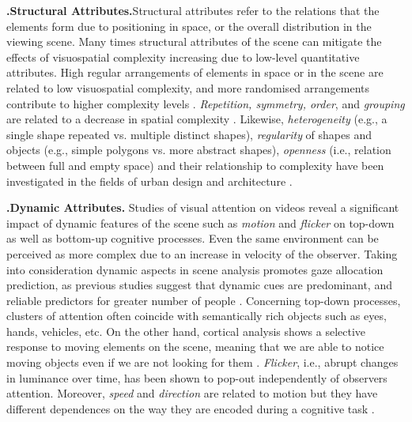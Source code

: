 \documentclass[a4paper]{article}
\begin{document}
\textbf{\small{}.\quad Structural Attributes.}\quad   Structural attributes refer to the relations that the elements form due to positioning in space, or the overall distribution in the viewing scene. Many times structural attributes of the scene can mitigate the effects of visuospatial complexity increasing due to low-level quantitative attributes. High regular arrangements of elements in space or in the scene are related to low visuospatial complexity, and more randomised arrangements contribute to higher complexity levels \cite{Doyon-Poulin2012}. \emph{Repetition, symmetry, order}, and \emph{grouping} are related to a decrease in spatial complexity \cite{vanderHelm2000,Salingaros2014}. Likewise, \emph{heterogeneity} (e.g., a single shape repeated vs. multiple distinct shapes), \emph{regularity} of shapes and objects (e.g., simple polygons vs. more abstract shapes), \emph{openness} (i.e., relation between full and empty space) and their relationship to complexity have been investigated in the fields of urban design and architecture \cite{Boeing2018,Salingaros2014}.
 \smallskip


\textbf{\small{}.\quad Dynamic Attributes.} \quad Studies of visual attention on videos reveal a significant impact of dynamic features of the scene such as \emph{motion} and \emph{flicker} on top-down as well as bottom-up cognitive processes. Even the same environment can be perceived as more complex due to an increase in velocity of the observer. Taking into consideration dynamic aspects in scene analysis promotes gaze allocation prediction, as previous studies suggest that dynamic cues are predominant, and reliable predictors for greater number of people \cite{Mital2011}. Concerning top-down processes, clusters of attention often coincide with semantically rich objects such as eyes, hands, vehicles, etc. On the other hand, cortical analysis shows a selective response to moving elements on the scene, meaning that we are able to notice moving objects even if we are not looking for them \cite{Rosenholtz1999}. \emph{Flicker}, i.e.,  abrupt changes in luminance over time, has been shown to pop-out independently of observers attention. Moreover, \emph{speed} and \emph{direction} are related to motion but they have different dependences on the way they are encoded during a cognitive task  \cite{Carrasco2011,Mital2011}. 

\smallskip
\end{document}
